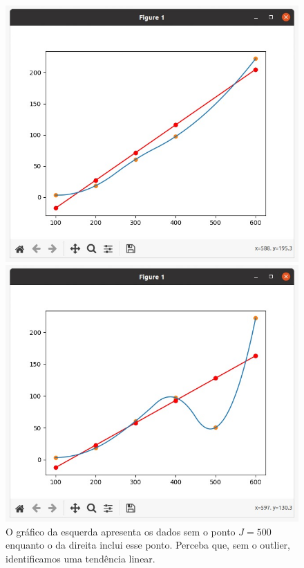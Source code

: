 \documentclass{article}
\begin{document}
\begin{figure}[!ht]
\label{figura:1}
\begin{multicols}{2}

    \includegraphics[width=\linewidth]{execucao_sem_J=500.jpeg}\par
    \includegraphics[width=\linewidth]{execucao_com_J=500.jpeg}\par

\end{multicols}
\caption{O gráfico da esquerda apresenta os dados sem o ponto $J=500$ enquanto o da direita inclui esse ponto. Perceba que, sem o outlier, identificamos uma tendência linear.}
\end{figure}
\end{document}
